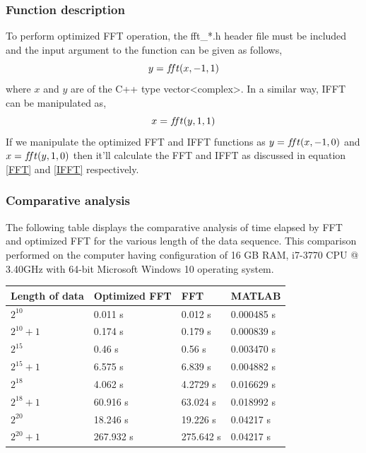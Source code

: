 \subsubsection{Function description}
To perform optimized FFT operation, the fft\_*.h header file must be included and the input argument to the function can be given as follows,
\begin{equation*}
	y=f\hspace{-0.85mm}ft(x,-1,1)
\end{equation*}
where $x$ and $y$ are of the C++ type vector<complex>. In a similar way, IFFT can be manipulated as,
\begin{equation*}
	x=f\hspace{-0.85mm}ft(y,1,1)
\end{equation*}
If we manipulate the optimized FFT and IFFT functions as $y=f\hspace{-0.85mm}ft(x,-1,0)$ and  $x=f\hspace{-0.85mm}ft(y,1,0)$ then it'll calculate the FFT and IFFT as discussed in equation \ref{FFT} and \ref{IFFT} respectively.
\subsubsection{Comparative analysis }
The following table displays the comparative analysis of time elapsed by FFT and optimized FFT for the various length of the data sequence. This comparison performed on the computer having configuration of 16 GB RAM, i7-3770 CPU @ 3.40GHz with 64-bit Microsoft Windows 10 operating system.
\begin{center}
	\begin{tabular}{ |p{4cm}||p{3cm}|p{3cm}|p{3cm}|   }
		\hline
		\centering \textbf{Length of data} & \textbf{Optimized FFT}& \textbf{FFT}&\textbf{MATLAB}\\
		\hline
		\hline
		\centering \textbf{$2^{10}$}   & 0.011 s  & 0.012 s & 0.000485 s\\
		\hline
		\centering \textbf{$2^{10}+1$} & 0.174 s  & 0.179 s & 0.000839 s\\
		\hline
		\centering \textbf{$2^{15}$}   & 0.46 s   & 0.56 s  & 0.003470 s\\
		\hline
		\centering \textbf{$2^{15}+1$} & 6.575 s  & 6.839 s & 0.004882 s\\
		\hline
		\centering \textbf{$2^{18}$}   & 4.062 s  & 4.2729 s& 0.016629 s \\
		\hline
		\centering \textbf{$2^{18}+1$} & 60.916 s & 63.024 s& 0.018992 s\\
		\hline
		\centering \textbf{$2^{20}$}   & 18.246 s & 19.226 s&  0.04217 s\\
		\hline
		\centering \textbf{$2^{20}+1$} & 267.932 s & 275.642 s & 0.04217 s \\
		\hline
	\end{tabular}
\end{center}






